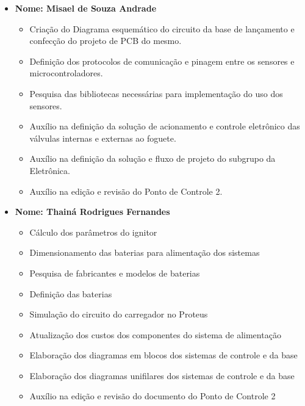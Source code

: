 \begin{itemize}
    
    \item \textbf{Nome: Misael de Souza Andrade}
    \begin{itemize}
    \item Criação do Diagrama esquemático do circuito da base de lançamento e confecção do projeto de PCB do mesmo.
    \item Definição dos protocolos de comunicação e pinagem entre os  sensores e microcontroladores.
    \item Pesquisa das bibliotecas necessárias para implementação do uso dos sensores.
    \item Auxílio na definição da solução de acionamento e controle eletrônico das válvulas internas e externas ao foguete.
    \item Auxílio na definição da solução e fluxo de projeto do subgrupo da Eletrônica.
    \item Auxílio na edição e revisão do Ponto de Controle 2.
    \end{itemize}
    
    
    \item \textbf{Nome: Thainá Rodrigues Fernandes}
    \begin{itemize}
    \item Cálculo dos parâmetros do ignitor
	\item Dimensionamento das baterias para alimentação dos sistemas
	\item Pesquisa de fabricantes e modelos de baterias
	\item Definição das baterias
	\item Simulação do circuito do carregador no Proteus
	\item Atualização dos custos dos componentes do sistema de alimentação
	\item Elaboração dos diagramas em blocos dos sistemas de controle e da base
	\item Elaboração dos diagramas unifilares dos sistemas de controle e da base
	\item Auxílio na edição e revisão do documento do Ponto de Controle 2 
    \end{itemize}

    
    
    
\end{itemize}


